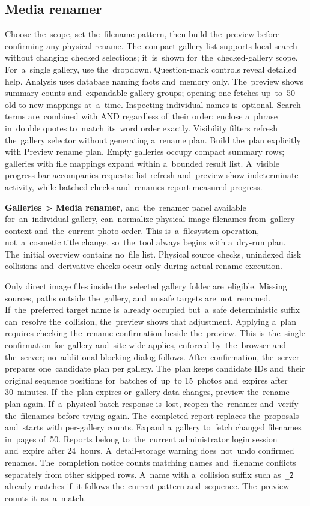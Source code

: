 \documentclass[11pt,a4paper]{article}
\newcommand{\ui}[1]{\textbf{#1}}
\newcommand{\codeword}[1]{\nolinkurl{#1}}
\begin{document}
\subsection{Media renamer}

Choose the~scope, set the~filename pattern, then build the~preview before
confirming any physical rename. The~compact gallery list supports local search
without changing checked selections; it~is~shown for~the~checked-gallery scope.
For~a~single gallery, use the~dropdown. Question-mark controls reveal detailed
help. Analysis uses database naming facts and~memory only. The~preview shows
summary counts and~expandable gallery groups; opening one fetches up~to~50
old-to-new mappings at~a~time. Inspecting individual names is~optional. Search
terms are~combined with AND regardless of~their order; enclose a~phrase
in~double quotes to~match its~word order exactly. Visibility filters refresh
the~gallery selector without generating a~rename plan. Build the~plan explicitly
with Preview rename plan. Empty galleries occupy compact summary rows; galleries
with file mappings expand within a~bounded result list. A~visible progress bar
accompanies requests: list refresh and~preview show indeterminate activity,
while batched checks and~renames report measured progress.

\ui{Galleries > Media renamer}, and~the~renamer panel available
for~an~individual gallery, can~normalize physical image filenames from~gallery
context and~the~current photo order. This is~a~filesystem operation,
not~a~cosmetic title change, so~the~tool always begins with a~dry-run plan.
The~initial overview contains no~file list. Physical source checks, unindexed
disk collisions and~derivative checks occur only during actual rename execution.

Only direct image files inside the~selected gallery folder are~eligible. Missing
sources, paths outside the~gallery, and~unsafe targets are~not~renamed.
If~the~preferred target name is~already occupied but~a~safe deterministic suffix
can~resolve the~collision, the~preview shows that adjustment. Applying a~plan
requires checking the~rename confirmation beside the~preview. This is~the~single
confirmation for~gallery and~site-wide applies, enforced by~the~browser and
the~server; no~additional blocking dialog follows.
After confirmation, the~server prepares one~candidate plan per gallery. The~plan
keeps candidate IDs and~their original sequence positions for~batches of~up~to
15~photos and~expires after 30~minutes. If~the~plan expires or~gallery data changes,
preview the~rename plan again. If~a~physical batch response is~lost, reopen
the~renamer and~verify the~filenames before trying again. The~completed report
replaces the~proposals and~starts
with per-gallery counts. Expand a~gallery to~fetch changed filenames in~pages
of~50. Reports belong to~the~current administrator login session and~expire
after 24~hours. A~detail-storage warning does~not~undo confirmed renames.
The~completion notice counts matching names and~filename conflicts separately
from other skipped rows.
A~name with a~collision suffix such as~\codeword{\_2} already matches if~it
follows the~current pattern and~sequence. The~preview counts it~as~a~match.
\end{document}

